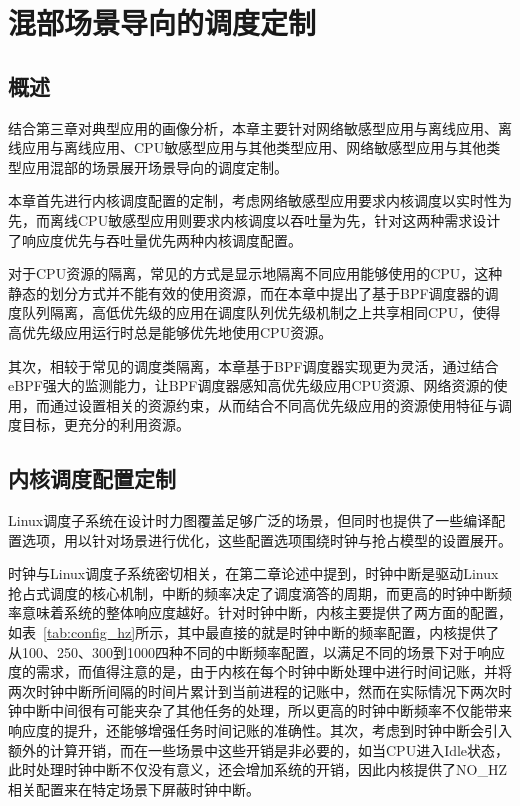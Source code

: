 \chapter{混部场景导向的调度定制}\label{chap:sched_policy}

\section{概述}

结合第三章对典型应用的画像分析，本章主要针对网络敏感型应用与离线应用、离线应用与离线应用、CPU敏感型应用与其他类型应用、网络敏感型应用与其他类型应用混部的场景展开场景导向的调度定制。

本章首先进行内核调度配置的定制，考虑网络敏感型应用要求内核调度以实时性为先，而离线CPU敏感型应用则要求内核调度以吞吐量为先，针对这两种需求设计了响应度优先与吞吐量优先两种内核调度配置。

对于CPU资源的隔离，常见的方式是显示地隔离不同应用能够使用的CPU，这种静态的划分方式并不能有效的使用资源，而在本章中提出了基于BPF调度器的调度队列隔离，高低优先级的应用在调度队列优先级机制之上共享相同CPU，使得高优先级应用运行时总是能够优先地使用CPU资源。

其次，相较于常见的调度类隔离，本章基于BPF调度器实现更为灵活，通过结合eBPF强大的监测能力，让BPF调度器感知高优先级应用CPU资源、网络资源的使用，而通过设置相关的资源约束，从而结合不同高优先级应用的资源使用特征与调度目标，更充分的利用资源。

\section{内核调度配置定制}

Linux调度子系统在设计时力图覆盖足够广泛的场景，但同时也提供了一些编译配置选项，用以针对场景进行优化，这些配置选项围绕时钟与抢占模型的设置展开。

时钟与Linux调度子系统密切相关，在第二章论述中提到，时钟中断是驱动Linux抢占式调度的核心机制，中断的频率决定了调度滴答的周期，而更高的时钟中断频率意味着系统的整体响应度越好。针对时钟中断，内核主要提供了两方面的配置，如表~\ref{tab:config_hz}所示，其中最直接的就是时钟中断的频率配置，内核提供了从100、250、300到1000四种不同的中断频率配置，以满足不同的场景下对于响应度的需求，而值得注意的是，由于内核在每个时钟中断处理中进行时间记账，并将两次时钟中断所间隔的时间片累计到当前进程的记账中，然而在实际情况下两次时钟中断中间很有可能夹杂了其他任务的处理，所以更高的时钟中断频率不仅能带来响应度的提升，还能够增强任务时间记账的准确性。其次，考虑到时钟中断会引入额外的计算开销，而在一些场景中这些开销是非必要的，如当CPU进入Idle状态，此时处理时钟中断不仅没有意义，还会增加系统的开销，因此内核提供了NO\_HZ相关配置来在特定场景下屏蔽时钟中断。

